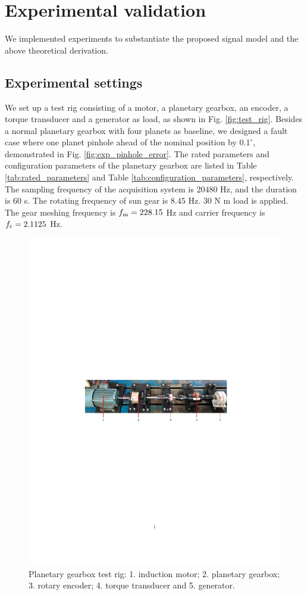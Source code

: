 \documentclass[a4paper,fleqn]{cas-sc}%
\begin{document}
\section{Experimental validation\label{sec:experimental_validation}}
We implemented experiments to substantiate the proposed signal model and the above theoretical derivation.
\subsection{Experimental settings}
\par We set up a test rig consisting of a motor, a planetary gearbox, an encoder,  a torque transducer and a generator as load, as shown in Fig. \ref{fig:test_rig}. Besides a normal planetary gearbox with four planets as baseline,  we designed a fault case where one planet pinhole ahead of the nominal position by $0.1^{\circ}$, demonstrated in Fig. \ref{fig:exp_pinhole_error}. The rated parameters and configuration parameters of the planetary gearbox are listed in Table \ref{tab:rated_parameters} and Table \ref{tab:configuration_parameters}, respectively. The sampling frequency of the acquisition system is $20480$ Hz, and the duration is $60$ s. The rotating frequency of sun gear is $8.45$ Hz. $30$ N m load is applied. The gear meshing frequency is $f_{\rm m}=228.15$ Hz and carrier frequency is $f_{\rm c}=2.1125$ Hz.
\begin{figure}[pos=htbp]
    \centering
    \includegraphics{test_rig_configuration.pdf}
    \caption{Planetary gearbox test rig: 1. induction motor; 2. planetary gearbox; 3. rotary encoder; 4. torque transducer and 5. generator.}
    \label{fig:tets_rig}
\end{figure} 
\end{document}
